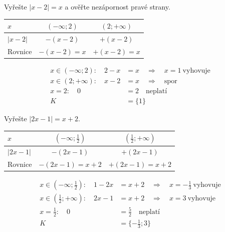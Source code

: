 \documentclass[11pt,a4paper]{article}
\begin{document}
\begin{prikladReseniBox}[title={Příklad 2}]
Vyřešte $|x-2|=x$ a ověřte nezápornost pravé strany.
\tcblower
\begin{center}
\begingroup\footnotesize
\renewcommand{\arraystretch}{1.32}
\begin{tabular}{@{}lcc@{}}
\toprule
$x$ & $(-\infty;2)$ & $(2;+\infty)$ \\
\midrule
$|x - 2|$ & $-(x - 2)$ & $+(x - 2)$ \\
\midrule
Rovnice & $-(x - 2)=x$ & $+(x - 2)=x$ \\
\bottomrule
\end{tabular}
\endgroup
\end{center}
\[\begin{aligned}x\in (-\infty;2):\quad 2 - x &= x\quad\Longrightarrow\quad x=1\ \text{vyhovuje}\\[2pt]
x\in (2;+\infty):\quad x - 2 &= x\quad\Longrightarrow\quad \text{spor}\\[2pt]
x=2:\quad 0 &= 2\quad\text{neplatí}\\[2pt]
K&=\{1\}\end{aligned}\]
\end{prikladReseniBox}
\begin{prikladReseniBox}[title={Příklad 3}]
Vyřešte $|2x-1|=x+2$.
\tcblower
\begin{center}
\begingroup\footnotesize
\renewcommand{\arraystretch}{1.32}
\begin{tabular}{@{}lcc@{}}
\toprule
$x$ & $(-\infty;\frac{1}{2})$ & $(\frac{1}{2};+\infty)$ \\
\midrule
$|2 x - 1|$ & $-(2 x - 1)$ & $+(2 x - 1)$ \\
\midrule
Rovnice & $-(2 x - 1)=x + 2$ & $+(2 x - 1)=x + 2$ \\
\bottomrule
\end{tabular}
\endgroup
\end{center}
\[\begin{aligned}x\in (-\infty;\frac{1}{2}):\quad 1 - 2 x &= x + 2\quad\Longrightarrow\quad x=- \frac{1}{3}\ \text{vyhovuje}\\[2pt]
x\in (\frac{1}{2};+\infty):\quad 2 x - 1 &= x + 2\quad\Longrightarrow\quad x=3\ \text{vyhovuje}\\[2pt]
x=\frac{1}{2}:\quad 0 &= \frac{5}{2}\quad\text{neplatí}\\[2pt]
K&=\{- \frac{1}{3};3\}\end{aligned}\]
\end{prikladReseniBox}
\end{document}
